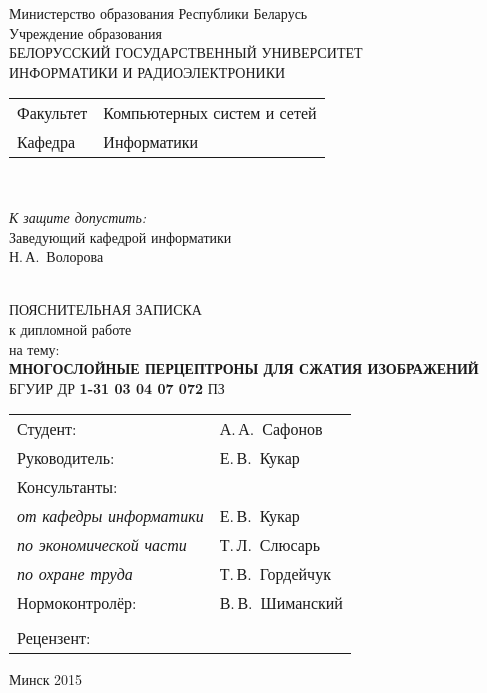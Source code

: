 \begin{titlepage}
  \begin{center}
	Министерство образования Республики Беларусь\\[1em]
	Учреждение образования\\
	БЕЛОРУССКИЙ ГОСУДАРСТВЕННЫЙ УНИВЕРСИТЕТ \\
	ИНФОРМАТИКИ И РАДИОЭЛЕКТРОНИКИ\\[1em]

	\begin{minipage}{\textwidth}
	  \begin{flushleft}
	    \begin{tabular}{ l l }
	      Факультет & Компьютерных систем и сетей\\
	      Кафедра   & Информатики
	    \end{tabular}
	  \end{flushleft}
	\end{minipage}\\[1em]

	\begin{minipage}{\textwidth}
	  \begin{flushright}
	    \textit{К защите допустить:}\\
	    Заведующий кафедрой информатики\\
	    \underline{\hspace*{4.5cm}} Н.\,А.~Волорова
	  \end{flushright}
	\end{minipage}\\[3em]

	{ПОЯСНИТЕЛЬНАЯ ЗАПИСКА}\\
	{к дипломной работе}\\
	{на тему:}\\[1em]
	\textbf{\large МНОГОСЛОЙНЫЕ ПЕРЦЕПТРОНЫ ДЛЯ СЖАТИЯ ИЗОБРАЖЕНИЙ}\\[1em]


	{БГУИР ДР \textbf{1-31 03 04 07 072} ПЗ}\\[2em]

	\begin{tabular}{ p{}p{} }
	  Студент: & А.\,А.~Сафонов \\
	  Руководитель: & Е.\,В.~Кукар \\
	  Консультанты: &\\
	  \hspace*{3ex}\emph{от кафедры информатики} & Е.\,В.~Кукар \\
	  \hspace*{3ex}\emph{по экономической части} & Т.\,Л.~Слюсарь \\
	  \hspace*{3ex}\emph{по охране труда} & Т.\,В.~Гордейчук \\
	  Нормоконтролёр: & В.\,В.~Шиманский\\
	  & \\
	  Рецензент: &  \\
	\end{tabular}

	\vfill
	{\normalsize Минск 2015}
  \end{center}
\end{titlepage}
